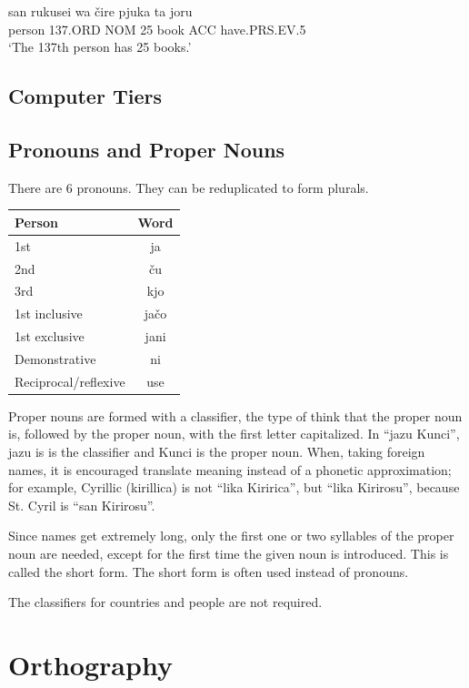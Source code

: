 \documentclass{clgrammar}
\begin{document}
\begin{exe}
	\ex
	\gll san rukusei wa čire pjuka ta joru\\
	person 137.ORD NOM  25 book ACC have.PRS.EV.5 \\   
	\trans `The 137th person has 25 books.'
\end{exe}


\chapter{Computer Tiers}

\chapter{Pronouns and Proper Nouns}

There are 6 pronouns. They can be reduplicated to form plurals.

\begin{center}
	\begin{tabular}{l|c}
		Person & Word \\
		\hline
		1st & ja \\
		2nd & ču \\ 
		3rd & kjo \\
		1st inclusive & jačo \\
		1st exclusive & jani \\
		Demonstrative & ni \\
		Reciprocal/reflexive & use \\
	\end{tabular}
\end{center}

Proper nouns are formed with a classifier, the type of think that the proper noun is, followed by the proper noun, with the first letter capitalized. In ``jazu Kunci'', jazu is is the classifier and Kunci is the proper noun. When, taking foreign names, it is encouraged translate meaning instead of a phonetic approximation; for example, Cyrillic (kirillica) is not ``lika Kiririca'', but ``lika Kirirosu'', because St. Cyril is ``san Kirirosu''.

	Since names get extremely long, only the first one or two syllables of the proper noun are needed, except for the first time the given noun is introduced. This is called the short form. The short form is often used instead of pronouns. 

	The classifiers for countries and people are not required. 

\part{Orthography}
\end{document}
